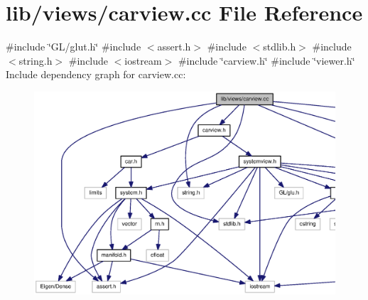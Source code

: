 \section{lib/views/carview.cc \-File \-Reference}
\label{carview_8cc}
{\ttfamily \#include \char`\"{}\-G\-L/glut.\-h\char`\"{}}\*
{\ttfamily \#include $<$assert.\-h$>$}\*
{\ttfamily \#include $<$stdlib.\-h$>$}\*
{\ttfamily \#include $<$string.\-h$>$}\*
{\ttfamily \#include $<$iostream$>$}\*
{\ttfamily \#include \char`\"{}carview.\-h\char`\"{}}\*
{\ttfamily \#include \char`\"{}viewer.\-h\char`\"{}}\*
\-Include dependency graph for carview.\-cc\-:
\nopagebreak
\begin{figure}[H]
\begin{center}
\leavevmode
\includegraphics[width=350pt]{carview_8cc__incl}
\end{center}
\end{figure}
